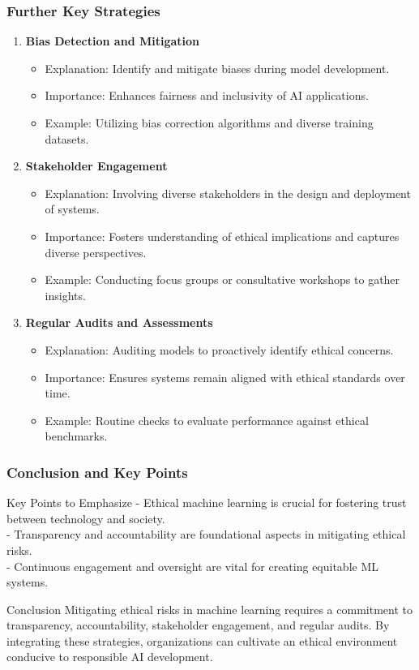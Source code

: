 \documentclass[aspectratio=169]{beamer}
\begin{document}
\begin{frame}[fragile]
    \frametitle{Further Key Strategies}
    \begin{enumerate}[resume]
        \item \textbf{Bias Detection and Mitigation}
            \begin{itemize}
                \item Explanation: Identify and mitigate biases during model development.
                \item Importance: Enhances fairness and inclusivity of AI applications.
                \item Example: Utilizing bias correction algorithms and diverse training datasets.
            \end{itemize}
        \item \textbf{Stakeholder Engagement}
            \begin{itemize}
                \item Explanation: Involving diverse stakeholders in the design and deployment of systems.
                \item Importance: Fosters understanding of ethical implications and captures diverse perspectives.
                \item Example: Conducting focus groups or consultative workshops to gather insights.
            \end{itemize}
        \item \textbf{Regular Audits and Assessments}
            \begin{itemize}
                \item Explanation: Auditing models to proactively identify ethical concerns.
                \item Importance: Ensures systems remain aligned with ethical standards over time.
                \item Example: Routine checks to evaluate performance against ethical benchmarks.
            \end{itemize}
    \end{enumerate}
\end{frame}

\begin{frame}[fragile]
    \frametitle{Conclusion and Key Points}
    \begin{block}{Key Points to Emphasize}
        - Ethical machine learning is crucial for fostering trust between technology and society. \\
        - Transparency and accountability are foundational aspects in mitigating ethical risks. \\
        - Continuous engagement and oversight are vital for creating equitable ML systems.
    \end{block}
    \begin{block}{Conclusion}
        Mitigating ethical risks in machine learning requires a commitment to transparency, accountability, stakeholder engagement, and regular audits. By integrating these strategies, organizations can cultivate an ethical environment conducive to responsible AI development.
    \end{block}
\end{frame}
\end{document}
